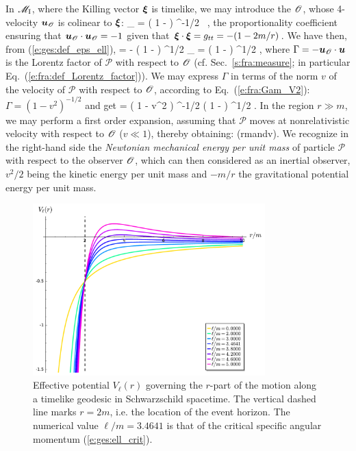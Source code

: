 In $\mathscr{M}_{\rm I}$, where the Killing vector $\bm{\xi}$ is timelike,
we may introduce the 
$\mathscr{O}$, whose 4-velocity $\bm{u}_{\mathscr{O}}$ is colinear to $\bm{\xi}$:
\be
    _{\Obs} = \left( 1 -  \right) ^{-1/2} \, \w{\xi} ,
\ee
the proportionality coefficient ensuring that $\bm{u}_{\mathscr{O}}\cdot\bm{u}_{\mathscr{O}}=-1$
given that $\bm{\xi}\cdot\bm{\xi} = g_{tt} = - (1-2m/r)$.
We have then, from (\ref{e:ges:def_eps_ell}),
\be
    \veps = - \left( 1 -  \right) ^{1/2} _{\Obs}\cdot{}
        = \Gamma \left( 1 -  \right) ^{1/2} ,
\ee
where $\Gamma = - \bm{u}_{\mathscr{O}}\cdot\bm{u}$ is the Lorentz factor of $\mathscr{P}$
with respect to $\mathscr{O}$ (cf. Sec.~\ref{s:fra:measure}; in particular Eq.~(\ref{e:fra:def_Lorentz_factor})). We may express $\Gamma$ in terms of the norm $v$ of the
velocity of $\mathscr{P}$ with respect to $\mathscr{O}$, according to Eq.~(\ref{e:fra:Gam_V2}):
$\Gamma = (1-v^2)^{-1/2}$ and get
\be
    \veps = \left( 1 - v^2 \right) ^{-1/2} \left( 1 -  \right) ^{1/2}  .
\ee
In the region $r\gg m$, we may perform a first order expansion, assuming
that  $\mathscr{P}$ moves at nonrelativistic velocity with respect to $\mathscr{O}$
($v\ll 1$), thereby obtaining:
\be
     \qquad
    \left(r\gg m\quad\mbox{and}\quad v\right).
\ee
We recognize in the right-hand side the \emph{Newtonian mechanical energy per
unit mass} of particle $\mathscr{P}$ with respect to the observer $\mathscr{O}$, which can
then considered as an inertial observer, $v^2/2$ being the kinetic energy per unit mass
and $-m/r$ the gravitational potential energy per unit mass.

\begin{figure}
\centerline{\includegraphics[width=0.8\textwidth]{ges_eff_pot.pdf}}
\caption[]{\label{f:ges:eff_pot} \footnotesize
Effective potential $V_{\ell}(r)$ governing the $r$-part of the
motion along a timelike geodesic in
Schwarzschild spacetime. The vertical dashed line marks $r=2m$, i.e. the
location of the event horizon.
The numerical value $\ell/m=3.4641$ is that of the critical
specific angular momentum (\ref{e:ges:ell_crit}).}
\end{figure}


